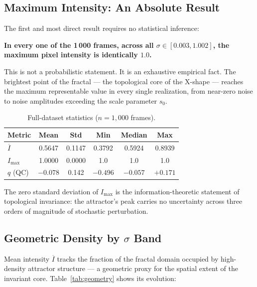 \documentclass[twocolumn,amsmath,amssymb,prl]{revtex4-2}
\begin{document}
\subsection{Maximum Intensity: An Absolute Result}

The first and most direct result requires no statistical inference:

\begin{center}
\textbf{In every one of the 1\,000 frames, across all $\sigma \in [0.003, 1.002]$,
the maximum pixel intensity is identically $1.0$.}
\end{center}

This is not a probabilistic statement.  It is an exhaustive empirical fact.
The brightest point of the fractal — the topological core of the X-shape —
reaches the maximum representable value in every single realization, from
near-zero noise to noise amplitudes exceeding the scale parameter $s_0$.

\begin{table}[h]
\centering
\caption{Full-dataset statistics ($n = 1{,}000$ frames).}
\label{tab:fullstats}
\begin{tabular}{lccccc}
\toprule
Metric & Mean & Std & Min & Median & Max \\
\midrule
$\overline{I}$ & 0.5647 & 0.1147 & 0.3792 & 0.5924 & 0.8939 \\
$I_{\max}$     & 1.0000 & 0.0000 & 1.0    & 1.0    & 1.0    \\
$q$ (QC)       & $-0.078$ & 0.142 & $-0.496$ & $-0.057$ & $+0.171$ \\
\bottomrule
\end{tabular}
\end{table}

The zero standard deviation of $I_{\max}$ is the information-theoretic
statement of topological invariance: the attractor's peak carries no
uncertainty across three orders of magnitude of stochastic perturbation.

\subsection{Geometric Density by $\sigma$ Band}

Mean intensity $\overline{I}$ tracks the fraction of the fractal domain
occupied by high-density attractor structure — a geometric proxy for the
spatial extent of the invariant core.  Table~\ref{tab:geometry} shows its
evolution:
\end{document}
